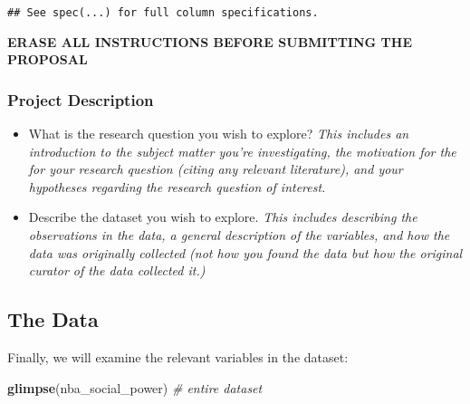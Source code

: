 \documentclass[]{article}
\newenvironment{Shaded}{\begin{snugshade}}{\end{snugshade}}
\newcommand{\CommentTok}[1]{\textcolor[rgb]{0.56,0.35,0.01}{\textit{#1}}}
\newcommand{\KeywordTok}[1]{\textcolor[rgb]{0.13,0.29,0.53}{\textbf{#1}}}
\newcommand{\NormalTok}[1]{#1}
\begin{document}
\begin{verbatim}
## See spec(...) for full column specifications.
\end{verbatim}

\textbf{ERASE ALL INSTRUCTIONS BEFORE SUBMITTING THE PROPOSAL}

\hypertarget{project-description}{%
\subsubsection{Project Description}\label{project-description}}

\begin{itemize}
\item
  What is the research question you wish to explore? \emph{This includes
  an introduction to the subject matter you're investigating, the
  motivation for the for your research question (citing any relevant
  literature), and your hypotheses regarding the research question of
  interest.}
\item
  Describe the dataset you wish to explore. \emph{This includes
  describing the observations in the data, a general description of the
  variables, and how the data was originally collected (not how you
  found the data but how the original curator of the data collected
  it.)}
\end{itemize}

\hypertarget{the-data}{%
\subsection{The Data}\label{the-data}}

Finally, we will examine the relevant variables in the dataset:

\begin{Shaded}
\begin{Highlighting}[]
\KeywordTok{glimpse}\NormalTok{(nba_social_power) }\CommentTok{# entire dataset}
\end{Highlighting}
\end{Shaded}
\end{document}
